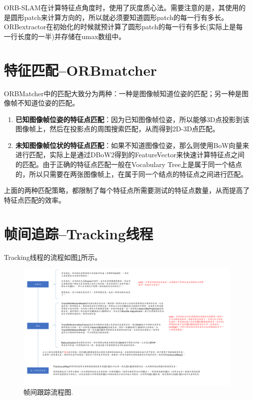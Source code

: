 ORB-SLAM在计算特征点角度时，使用了灰度质心法。需要注意的是，其使用的是圆形patch来计算方向的，所以就必须要知道圆形patch的每一行有多长。ORBextractor在初始化的时候就预计算了圆形patch的每一行有多长(实际上是每一行长度的一半)并存储在umax数组中。



\section{特征匹配--ORBmatcher}

ORBMatcher中的匹配大致分为两种：一种是图像帧知道位姿的匹配；另一种是图像帧不知道位姿的匹配。

\begin{enumerate}
	\item \textbf{已知图像帧位姿的特征点匹配}：因为已知图像帧位姿，所以能够3D点投影到该图像帧上，然后在投影点的周围搜索匹配，从而得到2D-3D点匹配。
	\item \textbf{未知图像帧位状的特征点匹配}：如果不知道图像位姿，那么则使用BoW向量来进行匹配，实际上是通过DBoW2得到的FeatureVector来快速计算特征点之间的匹配。由于正确的特征点匹配一般在Vocabulary Tree上是属于同一个结点的，所以只需要在两张图像帧上，在属于同一个结点的特征点之间进行匹配。
\end{enumerate}

上面的两种匹配策略，都限制了每个特征点所需要测试的特征点数量，从而提高了特征点匹配的效率。




\section{帧间追踪--Tracking线程}

Tracking线程的流程如图\ref{fig:orb_tracking}所示。

\begin{figure}[h]%
	\centering  %
	\includegraphics[width=1.0\linewidth]{image/ORB-SLAM/Tracking.pdf}  %
	\caption{帧间跟踪流程图.}  %
	\label{fig:orb_tracking}   %
\end{figure}





